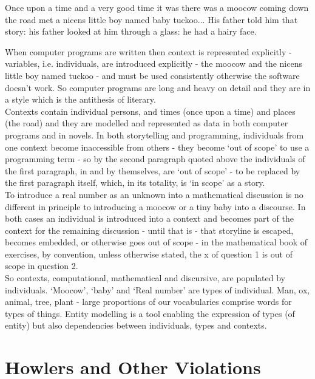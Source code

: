 \begin{erquote}
Once upon a time and a very good time it was there was a moocow coming down the road met a nicens little boy 
named baby tuckoo... His father told him that story: his father looked at him through a glass: he had a hairy face. 
 \end{erquote}

\noindent When computer programs are written then context is represented explicitly - variables, i.e. individuals, are introduced explicitly - the moocow and the nicens little boy named tuckoo - and must be used consistently otherwise the software doesn't work. So computer programs are long and heavy on detail and they are in a style which is the antithesis of literary. \\

\noindent Contexts contain individual persons, and times (once upon a time) and places (the road) and they are modelled and represented as data in both computer programs and in novels. In both storytelling and programming, individuals from one context become inaccessible from others - they become `out of scope' to use a programming term - so by the second paragraph quoted above the individuals of the first paragraph, in and by themselves, are `out of scope' - to be replaced by the first paragraph itself, which, in its totality, is `in scope' as a story.\\

\noindent To introduce a real number as an unknown into a mathematical discussion is no different in principle to introducing a moocow or a tiny baby into a discourse. In both cases an individual is introduced into a context and becomes part of the context for the remaining discussion - until that is - that storyline is escaped, becomes embedded, or otherwise goes out of scope - in the mathematical book of exercises, by convention, unless otherwise stated, the x of question 1 is out of scope in question 2.\\

\noindent So contexts, computational, mathematical and discursive, are populated by individuals. `Moocow', `baby' and `Real number'
are types of individual. Man, ox, animal, tree, plant - large proportions of our vocabularies comprise words for types of things. Entity modelling is a tool enabling the expression of types (of entity) but also dependencies between individuals, types and contexts.   \\

\section{Howlers and Other Violations}

